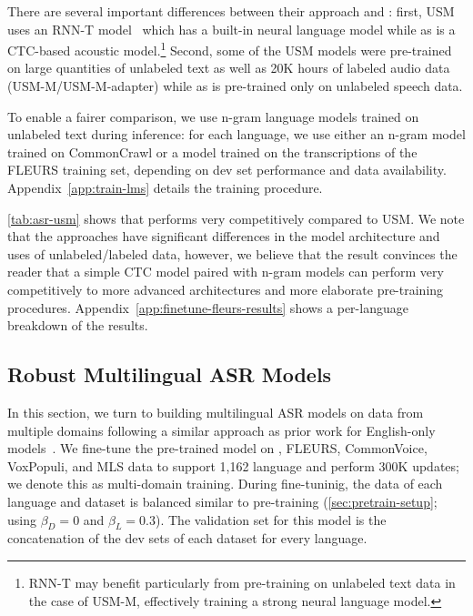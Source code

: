 There are several important differences between their approach and \modelname{}:
first, USM uses an RNN-T model~\citep{chan2015las} which has a built-in neural language model while as \modelname{} is a CTC-based acoustic model.\footnote{
RNN-T may benefit particularly from pre-training on unlabeled text data in the case of USM-M, effectively training a strong neural language model.}
Second, some of the USM models were pre-trained on large quantities of unlabeled text as well as 20K hours of labeled audio data (USM-M/USM-M-adapter) while as \modelname{} is pre-trained only on unlabeled speech data.

\insertResultsASRUSM

To enable a fairer comparison, we use n-gram language models trained on unlabeled text during inference: 
for each language, we use either an n-gram model trained on CommonCrawl or a model trained on the transcriptions of the FLEURS training set, depending on dev set performance and data availability.
Appendix~\ref{app:train-lms} details the training procedure.

\autoref{tab:asr-usm} shows that \modelname{} performs very competitively compared to USM.
We note that the approaches have significant differences in the model architecture and uses of unlabeled/labeled data, however, we believe that the result convinces the reader that a simple CTC model paired with n-gram models can perform very competitively to more advanced architectures and more elaborate pre-training procedures.
Appendix~\ref{app:finetune-fleurs-results} shows a per-language breakdown of the results.


\subsection{Robust Multilingual ASR Models}
\label{sec:asr-everything}

\insertTableASREverything

In this section, we turn to building multilingual ASR models on data from multiple domains following a similar approach as prior work for English-only models~\citep{likhomanenko2020rasr,chan2021speechstew,hsu2021robust}. 
We fine-tune the pre-trained  model on \MMS{}, FLEURS, CommonVoice, VoxPopuli, and MLS data to support 1,162 language and perform 300K updates; we denote this as multi-domain training.
During fine-tuninig, the data of each language and dataset is balanced similar to pre-training (\textsection\ref{sec:pretrain-setup}; using $\beta_D=0$ and $\beta_L=0.3$). 
The validation set for this model is the concatenation of the dev sets of each dataset for every language.

